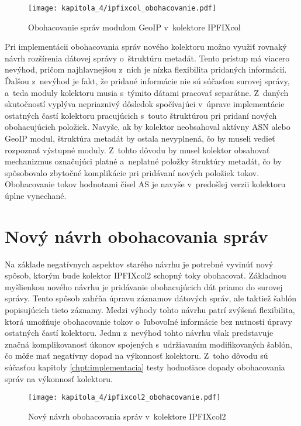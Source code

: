\begin{figure}[ht]
    \centering
    \texttt{[image: kapitola\_4/ipfixcol\_obohacovanie.pdf]}
    \caption{Obohacovanie správ modulom GeoIP v~kolektore IPFIXcol}
    \label{fig:stare_obohacovanie}
\end{figure}

Pri implementácii obohacovania správ nového kolektoru možno využiť rovnaký návrh rozšírenia dátovej správy o~štruktúru metadát. Tento prístup má viacero nevýhod, pričom najhlavnejšou z~nich je nízka flexibilita pridaných informácií.
Ďalšou z~nevýhod je fakt, že pridané informácie nie sú súčasťou surovej správy, a~teda moduly kolektoru musia s~týmito dátami pracovať separátne. Z~daných skutočností vyplýva nepriaznivý dôsledok spočívajúci v~úprave implementácie
ostatných častí kolektoru pracujúcich s~touto štruktúrou pri pridaní nových obohacujúcich položiek. Navyše, ak by kolektor neobsahoval aktívny ASN alebo GeoIP modul, štruktúra metadát by ostala nevyplnená,
čo by museli vedieť rozpoznať výstupné moduly. Z~tohto dôvodu by musel kolektor obsahovať mechanizmus označujúci platné a~neplatné položky štruktúry metadát, čo by spôsobovalo zbytočné komplikácie pri pridávaní nových položiek tokov.
Obohacovanie tokov hodnotami čísel AS je navyše v~predošlej verzii kolektoru úplne vynechané.

\section{Nový návrh obohacovania správ}
\label{sec:novy_navrh_obohacovania}

Na základe negatívnych aspektov starého návrhu je potrebné vyvinúť nový spôsob, ktorým bude kolektor IPFIXcol2 schopný toky obohacovať. Základnou myšlienkou nového návrhu je pridávanie obohacujúcich dát priamo do surovej správy. Tento spôsob zahŕňa úpravu záznamov dátových správ, ale taktiež
šablón popisujúcich tieto záznamy. Medzi výhody tohto návrhu patrí zvýšená flexibilita, ktorá umožňuje obohacovanie tokov o~ľubovoľné informácie bez nutnosti úpravy ostatných častí kolektoru. Jednu z~nevýhod tohto návrhu však predstavuje značná komplikovanosť úkonov spojených s~udržiavaním
modifikovaných šablón, čo môže mať negatívny dopad na výkonnosť kolektoru. Z~toho dôvodu sú súčasťou kapitoly \ref{chpt:implementacia} testy hodnotiace dopady obohacovania správ na výkonnosť kolektoru.

\begin{figure}[ht]
    \centering
    \texttt{[image: kapitola\_4/ipfixcol2\_obohacovanie.pdf]}
    \caption{Nový návrh obohacovania správ v~kolektore IPFIXcol2}
    \label{fig:nove_obohacovanie}
\end{figure}

